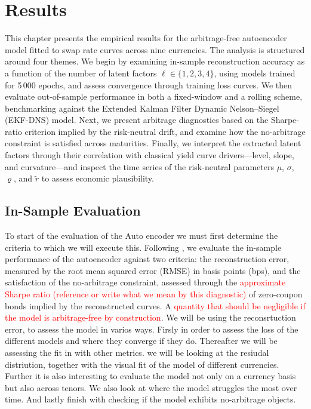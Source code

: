 \chapter{Results}

This chapter presents the empirical results for the arbitrage-free autoencoder model fitted to swap rate curves across nine currencies. The analysis is structured around four themes. We begin by examining in-sample reconstruction accuracy as a function of the number of latent factors $\ell \in \{1, 2, 3, 4\}$, using models trained for 5\,000 epochs, and assess convergence through training loss curves. We then evaluate out-of-sample performance in both a fixed-window and a rolling scheme, benchmarking against the Extended Kalman Filter Dynamic Nelson--Siegel (EKF-DNS) model. Next, we present arbitrage diagnostics based on the Sharpe-ratio criterion implied by the risk-neutral drift, and examine how the no-arbitrage constraint is satisfied across maturities. Finally, we interpret the extracted latent factors through their correlation with classical yield curve drivers---level, slope, and curvature---and inspect the time series of the risk-neutral parameters $\mu$, $\sigma$, $\varrho$, and $\tilde{r}$ to assess economic plausibility.





\section{In-Sample Evaluation}

To start of the evaluation of the Auto encoder we must first determine the criteria to which we will execute this. Following \citet{MatinWanPoulsen2025}, we evaluate the in-sample performance of the autoencoder against two criteria: the reconstruction error, measured by the root mean squared error (RMSE) in basis points (bps), and the satisfaction of the no-arbitrage constraint, assessed through the \textcolor{red}{approximate Sharpe ratio (reference or write what we mean by this diagnostic)} of zero-coupon bonds implied by the reconstructed curves. A \textcolor{red}{ quantity that should be negligible if the model is arbitrage-free by construction}. We will be using the reconsrtuction error, to assess the model in varios ways. Firsly in order to assess the loss of the different models and where they converge if they do. Thereafter we will be assessing the fit in with other metrics. we will be looking at the resiudal distriution, together with the visual fit of the model of different currencies. Further it is also interesting to evaluate the model not only on a currency basis but also across tenors. We also look at where the model struggles the most over time. And lastly finish with checking if the model exhibits no-arbitrage objects. 

